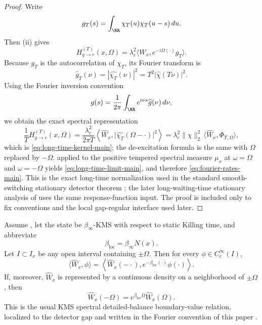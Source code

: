 \begin{proof}
Write
\[
g_T(s)=\int_{\RR}\chi_T(u)\chi_T(u-s)\,du.
\]
Then (ii) gives
\[
H_{g\to e}^{(T)}(x,\Omega)=\lambda_c^2\langle W_x,e^{-i\Omega(\cdot)}g_T\rangle.
\]
Because $g_T$ is the autocorrelation of $\chi_T$, its Fourier transform is
\[
\widehat g_T(\nu)=|\widehat{\chi_T}(\nu)|^2
=T^2\bigl|\widehat\chi(T\nu)\bigr|^2.
\]
Using the Fourier inversion convention
\[
g(s)=\frac{1}{2\pi}\int_{\RR}e^{i\nu s}\widehat g(\nu)\,d\nu,
\]
we obtain the exact spectral representation
\[
\frac{1}{T}H_{g\to e}^{(T)}(x,\Omega)
=\frac{\lambda_c^2}{2\pi T}
\left\langle \widehat W_x,\bigl|\widehat{\chi_T}(\Omega-\cdot)\bigr|^2\right\rangle
=\lambda_c^2\|\chi\|_2^2\,\langle \widehat W_x,\Phi_{T,\Omega}\rangle,
\]
which is \eqref{eq:long-time-kernel-main}; the de-excitation formula is the same
with $\Omega$ replaced by $-\Omega$.
 applied to the positive tempered
spectral measure $\mu_x$ at $\omega=\Omega$ and $\omega=-\Omega$ yields
\eqref{eq:long-time-limit-main}, and therefore
\eqref{eq:fourier-rates-main}. This is the exact long-time normalization used in
the standard smooth-switching stationary detector theorem
\cite[Sec.~II]{LoukoSatz2008}; the later long-waiting-time stationary analysis
of \cite{FewsterJuarezLouko2016} uses the same response-function input.
The proof is included only to fix conventions and the local gap-regular
interface used later.
\end{proof}

\begin{lemma}\label{lem:local-kms-spectral-main}
Assume , let the state be $\beta_\infty$-KMS
with respect to static Killing time, and abbreviate
\[
\beta_{\mathrm{loc}}=\beta_\infty N(x).
\]
Let $I\subset I_x$ be any open interval containing $\pm\Omega$. Then for every
$\phi\in C_c^\infty(I)$,
\begin{equation}\label{eq:kms-spectral-distribution-main}
\langle \widehat W_x,\phi\rangle
=\left\langle \widehat W_x(-\cdot),
e^{-\beta_{\mathrm{loc}}(\cdot)}\phi(\cdot)\right\rangle.
\end{equation}
If, moreover, $\widehat W_x$ is represented by a continuous density on a
neighborhood of $\pm\Omega$, then
\begin{equation}\label{eq:kms-detailed-balance-main}
\widehat W_x(-\Omega)=e^{\beta_{\mathrm{loc}}\Omega}\widehat W_x(\Omega).
\end{equation}
This is the usual KMS spectral detailed-balance boundary-value relation,
localized to the detector gap and written in the Fourier convention of this
paper \cite{HaagHugenholtzWinnink1967,KayWald1991,BratteliRobinson1997}.
\end{lemma}


